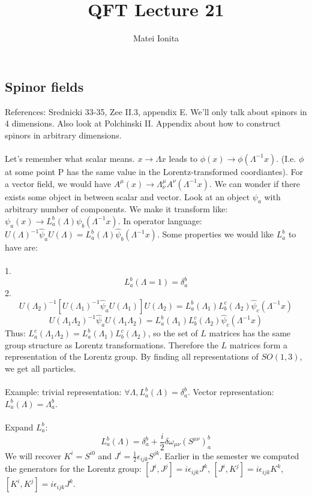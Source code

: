 \documentclass[12 pt]{article}
\title{QFT Lecture 21}
\author{Matei Ionita}
\begin{document}
  \maketitle

\subsection*{Spinor fields}
References: Srednicki 33-35, Zee II.3, appendix E. We'll only talk about spinors in 4 dimensions. Also look at Polchinski II. Appendix about how to construct spinors in arbitrary dimensions.
\\
\\
Let's remember what scalar means. $x\to \Lambda x$ leads to $\phi(x) \to \phi(\Lambda^{-1} x)$. (I.e. $\phi$ at some point P has the same value in the Lorentz-transformed coordiantes). For a vector field, we would have $A^{\mu} (x) \to \Lambda^{\mu}_{\nu} A^{\nu} (\Lambda^{-1} x)$. We can wonder if there exists some object in between scalar and vector. Look at an object $\psi_a$ with arbitrary number of components. We make it transform like: $\psi_a (x) \to L_a^b (\Lambda) \psi_b (\Lambda^{-1} x) $. In operator language: $U(\Lambda)^{-1} \hat \psi_a U(\Lambda) = L_a^b (\Lambda) \hat \psi_b (\Lambda^{-1} x)$. Some properties we would like $L_a^b$ to have are:
\\
\\
1. \[ L_a^b (\Lambda = 1) = \delta_a^b \]
2. \[ U(\Lambda_2)^{-1} \left[ U(\Lambda_1)^{-1} \hat \psi_a U(\Lambda_1) \right] U(\Lambda_2) = L_a^b (\Lambda_1) L_b^c (\Lambda_2) \hat \psi_c (\Lambda^{-1} x) \]
\[ U(\Lambda_1\Lambda_2)^{-1}  \hat \psi_a  U(\Lambda_1\Lambda_2) = L_a^b (\Lambda_1) L_b^c (\Lambda_2) \hat \psi_c (\Lambda^{-1} x) \]
Thus: $L_a^c (\Lambda_1 \Lambda_2) = L_a^b (\Lambda_1) L_b^c (\Lambda_2)$, so the set of $L$ matrices has the same group structure as Lorentz transformations. Therefore the $L$ matrices form a representation of the Lorentz group. By finding all representations of $SO(1,3)$, we get all particles.
\\
\\
Example: trivial representation: $\forall \Lambda, L_a^b(\Lambda) = \delta_a^b$. Vector representation: $L_a^b(\Lambda) = \Lambda_a^b$.
\\
\\
Expand $L_a^b$:
\[     L_a^b (\Lambda) = \delta_a^b + \frac{i}{2} \delta \omega_{\mu\nu} (S^{\mu\nu})_a^b    \]
We will recover $K^i = S^{i0}$ and $J^i = \frac{1}{2} \epsilon_{ijk} S^{jk}$. Earlier in the semester we computed the generators for the Lorentz group: $[J^i, J^j] = i \epsilon_{ijk} J^k$, $[J^i,K^j] = i\epsilon_{ijk} K^k$, $[K^i, K^j] = i\epsilon_{ijk} J^k$.
\end{document}
